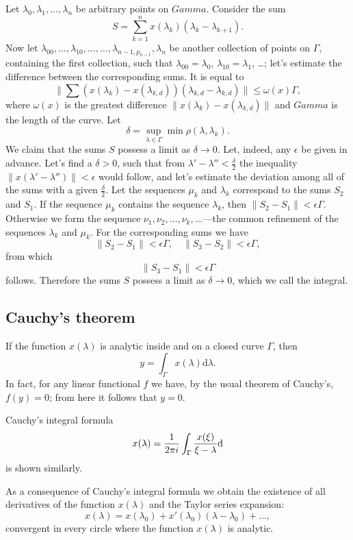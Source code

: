 \documentclass{article}
\theoremstyle{definition}
\newcommand{\intd}[3]{\int_{#1}{#2}\mathrm{d}#3}
\begin{document}
Let $\lambda_0, \lambda_1, \dots, \lambda_n$ be arbitrary points on $Gamma$. Consider the sum
$$ S = \sum_{k=1}^n x(\lambda_k)(\lambda_k-\lambda_{k+1}). $$
Now let $\lambda_{00}, \dots, \lambda_{10}, \dots, \dots, \lambda_{n-1,p_{n-1}},\lambda_n$ be another collection of points on $\Gamma$, containing the first collection, such that $\lambda_{00} = \lambda_0$, $\lambda_{10} = \lambda_1$, \dots; let's estimate the difference between the corresponding sums. It is equal to
$$ \|\sum (x(\lambda_k) - x(\lambda_{k,d}))(\lambda_{k,d} - \lambda_{k,d})\| \leq \omega(x)\Gamma, $$
where $\omega(x)$ is the greatest difference $\|x(\lambda_k) - x(\lambda_{k,d})\|$ and $Gamma$ is the length of the curve. Let
$$ \delta = \sup_{\lambda\in\Gamma} \min \rho(\lambda, \lambda_k). $$
We claim that the sums $S$ possess a limit as $\delta \to 0$. Let, indeed, any $\epsilon$ be given in advance. Let's find a $\delta>0$, such that from $\lambda'-\lambda''<\frac\delta2$ the inequality $\|x(\lambda'-\lambda'')\|<\epsilon$ would follow, and let's estimate the deviation among all of the sums with a given $\frac\delta2$. Let the sequences $\mu_k$ and $\lambda_k$ correspond to the sums $S_2$ and $S_1$. If the sequence $\mu_k$ contains the sequence $\lambda_k$, then $\|S_2-S_1\| < \epsilon\Gamma$. Otherwise we form the sequence $\nu_1, \nu_2, \dots, \nu_k, \dots$---the common refinement of the sequences $\lambda_k$ and $\mu_k$. For the corresponding sums we have
$$ \|S_2-S_1\| < \epsilon\Gamma, \quad \|S_3-S_2\| < \epsilon\Gamma, $$
from which
$$ \|S_3-S_1\| < \epsilon\Gamma $$
follows. Therefore the sums $S$ possess a limit as $\delta\to0$, which we call the integral.

\subsection{Cauchy's theorem}
If the function $x(\lambda)$ is analytic inside and on a closed curve $\Gamma$, then
$$ y = \intd{\Gamma}{x(\lambda)}{\lambda}. $$
In fact, for any linear functional $f$ we have, by the usual theorem of Cauchy's, $f(y)=0$; from here it follows that $y=0$.

Cauchy's integral formula
$$ x(\lambda) = \frac1{2\pi i}\intd{\Gamma}{\frac{x(\xi)}{\xi-\lambda}} $$
is shown similarly.

As a consequence of Cauchy's integral formula we obtain the existence of all derivatives of the function $x(\lambda)$ and the Taylor series expansion:
$$ x(\lambda) = x(\lambda_0) + x'(\lambda_0)(\lambda-\lambda_0) + \dots, $$
convergent in every circle where the function $x(\lambda)$ is analytic.
\end{document}
